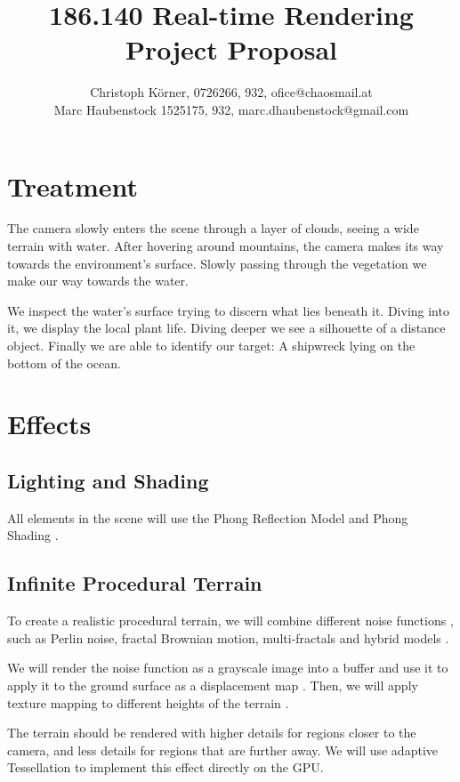 \documentclass[11pt,a4paper]{article}
\author{Christoph Körner, 0726266, 932, ofice@chaosmail.at\\Marc Haubenstock 1525175, 932, marc.dhaubenstock@gmail.com}
\title{186.140 Real-time Rendering\\Project Proposal}
\begin{document}
\maketitle

\section{Treatment}

The camera slowly enters the scene through a layer of clouds, seeing a wide terrain with water. After hovering around mountains, the camera makes its way towards the environment's surface. Slowly passing through the vegetation we make our way towards the water. 

We inspect the water's surface trying to discern what lies beneath it. Diving into it, we display the local plant life. Diving deeper we see a silhouette of a distance object. Finally we are able to identify our target: A shipwreck lying on the bottom of the ocean.  

\section{Effects}

\subsection{Lighting and Shading}

All elements in the scene will use the Phong Reflection Model and Phong Shading \cite{phong73}.

\subsection{Infinite Procedural Terrain}

To create a realistic procedural terrain, we will combine different noise functions \cite{ebert03}, such as Perlin noise, fractal Brownian motion, multi-fractals and hybrid models \cite{musgrave94}. 

We will render the noise function as a grayscale image into a buffer and use it to apply it to the ground surface as a displacement map \cite{moeller08}. Then, we will apply texture mapping \cite{shirly09} to different heights of the terrain \cite{ebert03}.

The terrain should be rendered with higher details for regions closer to the camera, and less details for regions that are further away. We will use adaptive Tessellation \cite{tessellation} to implement this effect directly on the GPU.
\end{document}
